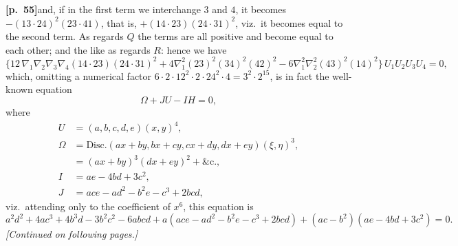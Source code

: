 \documentclass[11pt,a4paper]{article}
\providecommand{\Disc}{\mathrm{Disc}}
\begin{document}
\bigskip

\noindent\textbf{[p.~55]}\quad and, if in the first term we interchange $3$ and $4$, it becomes $-(13\cdot 24)^{2}(23\cdot 41)$, that is, $+(14\cdot 23)(24\cdot 31)^{2}$, viz.\ it becomes equal to the second term. As regards $Q$ the terms are all positive and become equal to each other; and the like as regards $R$: hence we have
\[
\bigl\{12\,\nabla_{1}\nabla_{2}\nabla_{3}\nabla_{4}(14\cdot 23)(24\cdot 31)^{2} + 4\nabla_{1}^{2}(23)^{2}(34)^{2}(42)^{2} - 6\nabla_{1}^{2}\nabla_{2}^{2}(43)^{2}(14)^{2}\bigr\}\,U_{1}U_{2}U_{3}U_{4} = 0,
\]
which, omitting a numerical factor $6\cdot 2\cdot 12^{2}\cdot 2\cdot 24^{2}\cdot 4 = 3^{2}\cdot 2^{15}$, is in fact the well-known equation
\[
\Omega + JU - IH = 0,
\]
where
\begin{align*}
U &= (a, b, c, d, e)(x, y)^{4}, \\
\Omega &= \Disc.(ax + by, bx + cy, cx + dy, dx + ey)(\xi, \eta)^{3}, \\
&= (ax + by)^{3}(dx + ey)^{2} + \&\text{c.}, \\
I &= ae - 4bd + 3c^{2}, \\
J &= ace - ad^{2} - b^{2}e - c^{3} + 2bcd,
\end{align*}
viz.\ attending only to the coefficient of $x^{6}$, this equation is
\[
a^{2}d^{2} + 4ac^{3} + 4b^{3}d - 3b^{2}c^{2} - 6abcd + a(ace - ad^{2} - b^{2}e - c^{3} + 2bcd) + (ac - b^{2})(ae - 4bd + 3c^{2}) = 0.
\]
\textit{[Continued on following pages.]}
\end{document}
